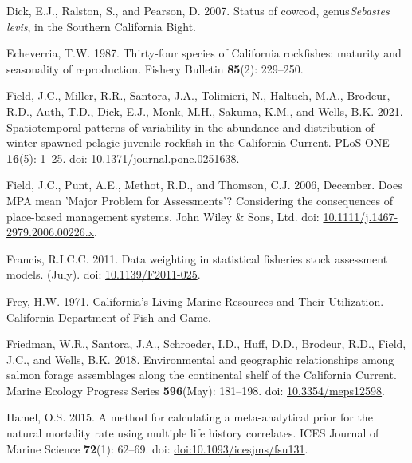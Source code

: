 \documentclass[
  english,
  a4paper,
]{article}
\newlength{\cslhangindent}
\newlength{\cslentryspacingunit} %
\newenvironment{CSLReferences}[2] %
 {%
  \setlength{\parindent}{0pt}
  \ifodd #1
  \let\oldpar\par
  \def\par{\hangindent=\cslhangindent\oldpar}
  \fi
  \setlength{\parskip}{#2\cslentryspacingunit}
 }%
 {}
\begin{document}
\begin{CSLReferences}{1}{0}
\leavevmode{}%
Dick, E.J., Ralston, S., and Pearson, D. 2007. {Status of cowcod, genus\emph{Sebastes levis}, in the Southern California Bight}.

\leavevmode{}%
Echeverria, T.W. 1987. {Thirty-four species of California rockfishes: maturity and seasonality of reproduction}. Fishery Bulletin \textbf{85}(2): 229--250.

\leavevmode{}%
Field, J.C., Miller, R.R., Santora, J.A., Tolimieri, N., Haltuch, M.A., Brodeur, R.D., Auth, T.D., Dick, E.J., Monk, M.H., Sakuma, K.M., and Wells, B.K. 2021. {Spatiotemporal patterns of variability in the abundance and distribution of winter-spawned pelagic juvenile rockfish in the California Current}. PLoS ONE \textbf{16}(5): 1--25. doi: \href{https://doi.org/10.1371/journal.pone.0251638}{10.1371/journal.pone.0251638}.

\leavevmode{}%
Field, J.C., Punt, A.E., Methot, R.D., and Thomson, C.J. 2006, December. {Does MPA mean 'Major Problem for Assessments'? Considering the consequences of place-based management systems}. John Wiley \& Sons, Ltd. doi: \href{https://doi.org/10.1111/j.1467-2979.2006.00226.x}{10.1111/j.1467-2979.2006.00226.x}.

\leavevmode{}%
Francis, R.I.C.C. 2011. {Data weighting in statistical fisheries stock assessment models}. (July). doi: \href{https://doi.org/10.1139/F2011-025}{10.1139/F2011-025}.

\leavevmode{}%
Frey, H.W. 1971. {California's Living Marine Resources and Their Utilization. California Department of Fish and Game}.

\leavevmode{}%
Friedman, W.R., Santora, J.A., Schroeder, I.D., Huff, D.D., Brodeur, R.D., Field, J.C., and Wells, B.K. 2018. {Environmental and geographic relationships among salmon forage assemblages along the continental shelf of the California Current}. Marine Ecology Progress Series \textbf{596}(May): 181--198. doi: \href{https://doi.org/10.3354/meps12598}{10.3354/meps12598}.

\leavevmode{}%
Hamel, O.S. 2015. {A method for calculating a meta-analytical prior for the natural mortality rate using multiple life history correlates}. ICES Journal of Marine Science \textbf{72}(1): 62--69. doi: \href{https://doi.org/doi:10.1093/icesjms/fsu131}{doi:10.1093/icesjms/fsu131}.


\end{CSLReferences}
\end{document}
